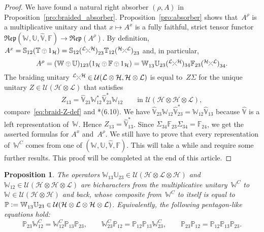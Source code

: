 \documentclass[a4paper]{amsart}
\numberwithin{equation}{section}
\theoremstyle{plain}
\numberwithin{theorem}{section}
\newtheorem{proposition}[theorem]{Proposition}
\theoremstyle{definition}
\theoremstyle{remark}
\newcommand{\tenscorep}{\mathbin{\begin{tikzpicture}[baseline,x=.75ex,y=.75ex] \draw[line width=.2pt] (-0.8,1.15)--(0.8,1.15);\draw[line width=.2pt](0,-0.25)--(0,1.15); \draw[line width=.2pt] (0,0.75) circle [radius = 1];\end{tikzpicture}}}
\newcommand*{\Braiding}[2]{\begin{tikzpicture}[baseline]
    \draw[-] (0,0) -- (1.4ex,1.4ex) node[right,inner sep=0pt] {$\scriptstyle #2$};
    \draw[-,draw=white,line width=2.4pt] (0,1.4ex) -- (1.4ex,0);
    \draw[-] (1.4ex,0) -- (0,1.4ex) node[left,inner sep=0pt] {$\scriptstyle #1$};
  \end{tikzpicture}}
\newcommand*{\Dualbraiding}[2]{\begin{tikzpicture}[baseline]
    \draw[-] (1.4ex,0) -- (0,1.4ex) node[left,inner sep=0pt] {$\scriptstyle #1$};
    \draw[-,draw=white,line width=2.4pt] (0,0) -- (1.4ex,1.4ex);
    \draw[-] (0,0) -- (1.4ex,1.4ex) node[right,inner sep=0pt] {$\scriptstyle #2$};
  \end{tikzpicture}}
\newcommand*{\Corep}[1]{\mathbb{#1}}          %
\newcommand*{\DuCorep}[1]{\hat{\Corep{#1}}}   %
\newcommand*{\Corepcat}[1]{\mathfrak{Rep}(#1)}%
\newcommand*{\Multunit}[1][]{\mathbb W^{#1}}%
\newcommand*{\ProjBichar}{\mathbb{P}}%
\newcommand*{\BrMultunit}{\mathbb F}%
\newcommand*{\Hils}[1][H]{\mathcal{#1}}%
\newcommand*{\U}{\mathcal U}%
\newcommand*{\defeq}{\mathrel{\vcentcolon=}}
\begin{document}
\begin{proof}
  We have found a natural right absorber \((\rho,A)\)
  in Proposition~\ref{pro:braided_absorber}.
  Proposition~\ref{pro:absorber} shows that~\(A^\rho\)
  is a multiplicative unitary and that \(x\mapsto A^x\)
  is a fully faithful, strict tensor functor
  \(\Corepcat{\Multunit,\Corep{U},\DuCorep{V},\BrMultunit} \to
  \Corepcat{A^\rho}\).
  By definition,
  \(A^x = \Corep{S}_{12} (\Corep{T}\tenscorep 1_{\Hils}) =
  \Corep{S}_{12} (\Braiding{\Hils[L]}{\Hils})^{\phantom1}_{23}
  \Corep{T}_{12} (\Dualbraiding{\Hils}{\Hils[L]})^{\phantom1}_{23}\)
  and, in particular,
  \[
  A^\rho = (\Multunit\tenscorep\Corep{U})_{123}
  (1_{\Hils} \tenscorep \BrMultunit\tenscorep 1_{\Hils})
  = \Multunit_{13}\Corep{U}_{23}
  (\Braiding{\Hils[L]}{\Hils})_{34}
  \BrMultunit_{23}
  (\Dualbraiding{\Hils}{\Hils[L]})^{\phantom1}_{34}.
  \]
  The braiding unitary
  \(\Braiding{\Hils[L]}{\Hils} \in \U(\Hils[L]\otimes
  \Hils,\Hils\otimes \Hils[L])\)
  is equal to~\(Z\Sigma\)
  for the unique unitary \(Z\in \U(\Hils\otimes \Hils[L])\)
  that satisfies
  \[
  Z_{13} = \DuCorep{V}_{23} \Multunit[*]_{12} \DuCorep{V}_{23}^*
  \Multunit_{12}
  \qquad \text{in }\U(\Hils\otimes \Hils\otimes \Hils[L]),
  \]
  compare~\eqref{eq:braid-Z-def} and
  \cite{Meyer-Roy-Woronowicz:Twisted_tensor_2}*{(6.10)}.  We have
  \(\DuCorep{V}_{23} \Multunit_{12} \DuCorep{V}_{23}^* =
  \Multunit_{12} \DuCorep{V}_{13}\)
  because \(\DuCorep{V}\)
  is a left representation of~\(\Multunit\).
  Hence \(Z_{13} = \DuCorep{V}_{13}^*\).
  Since
  \(\Sigma_{34} \BrMultunit_{23} \Sigma_{34} = \BrMultunit_{24}\),
  we get the asserted formulas for \(A^x\)
  and~\(A^\rho\).
  We still have to prove that every representation of~\(\Multunit[C]\)
  comes from one of \((\Multunit,\Corep{U},\DuCorep{V},\BrMultunit)\).
  This will take a while and require some further results.  This proof
  will be completed at the end of this article.
\end{proof}

\begin{proposition}
  \label{pro:projection_on_C}
  The operators
  \(\Multunit_{13}\Corep{U}_{23} \in
  \U(\Hils\otimes\Hils[L]\otimes\Hils)\)
  and \(\Multunit_{12} \in\U(\Hils\otimes\Hils\otimes\Hils[L])\)
  are bicharacters from the multiplicative unitary~\(\Multunit[C]\)
  to \(\Multunit\in\U(\Hils\otimes\Hils)\)
  and back, whose composite from~\(\Multunit[C]\)
  to itself is equal to
  \(\ProjBichar \defeq \Multunit_{13} \Corep{U}_{23}
  \in\U(\Hils\otimes\Hils[L]\otimes\Hils\otimes\Hils[L])\).
  Equivalently, the following pentagon-like equations hold:
  \begin{equation}
    \label{eq:projection_pentagon}
    \ProjBichar_{23}\Multunit[C]_{12}
    = \Multunit[C]_{12}\ProjBichar_{13}\ProjBichar_{23},\qquad
    \Multunit[C]_{23} \ProjBichar_{12}
    = \ProjBichar_{12}\ProjBichar_{13}\Multunit[C]_{23},\qquad
    \ProjBichar_{23}\ProjBichar_{12} =
    \ProjBichar_{12}\ProjBichar_{13}\ProjBichar_{23}.
  \end{equation}
\end{proposition}
\end{document}
